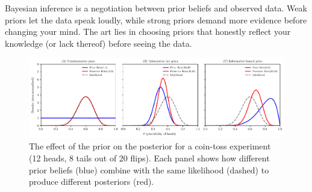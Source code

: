 \begin{exampleBox}
    Bayesian inference is a negotiation between prior beliefs and observed data. Weak priors let the data speak loudly, while strong priors demand more evidence before changing your mind. The art lies in choosing priors that honestly reflect your knowledge (or lack thereof) before seeing the data.
    
    \begin{figure}[H]
        \centering
        \includegraphics[width=\textwidth]{figs/models-vs-data/coin_priors_subplots.pdf}
        \caption{The effect of the prior on the posterior for a coin-toss experiment (12 heads, 8 tails out of 20 flips). Each panel shows how different prior beliefs (blue) combine with the same likelihood (dashed) to produce different posteriors (red).}
        \label{fig:coin-priors}
    \end{figure}
\end{exampleBox}
    

